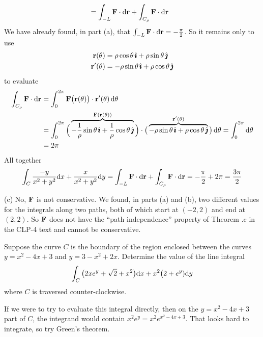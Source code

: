 \begin{solution}
\begin{align*}
&=\int_{-L}\mathbf{F}\cdot\mathrm{d}\mathbf{r} 
  + \int_{C_\rho}\mathbf{F}\cdot\mathrm{d}\mathbf{r} 
\end{align*}
We have already found, in part (a), that 
$\int_{-L}\mathbf{F}\cdot\mathrm{d}\mathbf{r}=-\frac{\pi}{2}$. So it remains only to use
\begin{align*}
\mathbf{r}(\theta) &= \rho\cos\theta\,\hat{\pmb{\imath}} +\rho\sin\theta\,\hat{\pmb{\jmath}} \\
\mathbf{r}'(\theta) &= -\rho\sin\theta\,\hat{\pmb{\imath}} +\rho\cos\theta\,\hat{\pmb{\jmath}}
\end{align*}
to evaluate
\begin{align*}
\int_{C_\rho}\mathbf{F}\cdot\mathrm{d}\mathbf{r}
&=\int_0^{2\pi} \mathbf{F}\big(\mathbf{r}(\theta)\big)\cdot\mathbf{r}'(\theta)\,\mathrm{d}\theta \\
&= \int_0^{2\pi} \Big(\overbrace{-\frac{1}{\rho}\sin\theta\,\hat{\pmb{\imath}}+\frac{1}{\rho}\cos\theta\,\hat{\pmb{\jmath}}}^
               {\mathbf{F}(\mathbf{r}(\theta))}\Big)
 \cdot\big(\overbrace{-\rho\sin\theta\,\hat{\pmb{\imath}} +\rho\cos\theta\,\hat{\pmb{\jmath}}}^
                     {\mathbf{r}'(\theta)}\big)\,\mathrm{d}\theta 
=\int_0^{2\pi}\mathrm{d}\theta \\
&=2\pi 
\end{align*}
All together
\begin{equation*}
\int_C \frac{-y}{x^2+y^2}\mathrm{d}x + \frac{x}{x^2+y^2}\mathrm{d}y
=\int_{-L}\mathbf{F}\cdot\mathrm{d}\mathbf{r} 
  + \int_{C_\rho}\mathbf{F}\cdot\mathrm{d}\mathbf{r} 
=-\frac{\pi}{2} +2\pi
=\frac{3\pi}{2}
\end{equation*}

(c) No, $\mathbf{F}$ is not conservative. We found, in parts (a) and (b),
two different values for the integrals along two paths, both of which start
at $(-2,2)$ and end at $(2,2)$. So $\mathbf{F}$ does not have the
``path independence'' property of Theorem .c
in the CLP-4 text and cannot be conservative.
\end{solution}

\begin{question}[M317 2012J] %
Suppose the curve $C$ is the boundary of the region enclosed between 
the curves $y = x^2 - 4x + 3$ and $y = 3 - x^2 + 2x$. Determine the 
value of the line integral
\begin{equation*}
\int_C \big(2xe^y + \sqrt{2} + x^2\big)\mathrm{d}x 
      + x^2 \big(2 + e^y)\mathrm{d}y
\end{equation*}
where $C$ is traversed counter-clockwise.
\end{question}

\begin{hint} 
If we were to try to evaluate this integral directly, then on the
$y=x^2-4x+3$ part of $C$, the 
integrand would contain $x^2 e^y = x^2 e^{x^2-4x+3}$. That looks hard to integrate, so try Green's theorem. 
\end{hint}

